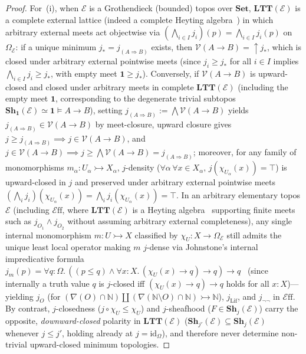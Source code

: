 \documentclass[10pt,twoside,openright]{book}
\theoremstyle{crmplain}
\theoremstyle{crmdef}
\theoremstyle{crmremark}
\newcommand{\Eff}{\mathcal{E}\mathrm{ff}}
\begin{document}
\begin{proof}
For~(i), when $\mathcal{E}$ is a Grothendieck (bounded) topos over $\mathbf{Set}$, $\mathbf{LTT}(\mathcal{E})$ is a complete external lattice (indeed a complete Heyting algebra~\cite[\S A4.5]{Johnstone02}) in which arbitrary external meets act objectwise via $(\bigwedge_{i \in I} j_i)(p) = \bigwedge_{i \in I} j_i(p)$ on $\Omega_{\mathcal{E}}$: if a unique minimum $j_* = j_{(A \Rightarrow B)}$ exists, then $\mathcal{V}(A \to B) = {\uparrow} j_*$, which is closed under arbitrary external pointwise meets (since $j_i \ge j_*$ for all $i \in I$ implies $\bigwedge_{i \in I} j_i \ge j_*$, with empty meet $\mathbf{1} \ge j_*$). Conversely, if $\mathcal{V}(A \to B)$ is upward-closed and closed under arbitrary meets in complete $\mathbf{LTT}(\mathcal{E})$ (including the empty meet $\mathbf{1}$, corresponding to the degenerate trivial subtopos $\mathbf{Sh}_{\mathbf{1}}(\mathcal{E}) \simeq \mathbf{1} \models A \to B$), setting $j_{(A \Rightarrow B)} := \bigwedge \mathcal{V}(A \to B)$ yields $j_{(A \Rightarrow B)} \in \mathcal{V}(A \to B)$ by meet-closure, upward closure gives $j \ge j_{(A \Rightarrow B)} \implies j \in \mathcal{V}(A \to B)$, and $j \in \mathcal{V}(A \to B) \implies j \ge \bigwedge \mathcal{V}(A \to B) = j_{(A \Rightarrow B)}$; moreover, for any family of monomorphisms $m_\alpha : U_\alpha \rightarrowtail X_\alpha$, $j$-density ($\forall \alpha\,\forall x \in X_\alpha,\, j(\chi_{U_\alpha}(x)) = \top$) is upward-closed in $j$ and preserved under arbitrary external pointwise meets $(\bigwedge_i j_i)(\chi_{U_\alpha}(x)) = \bigwedge_i j_i(\chi_{U_\alpha}(x)) = \top$. In an arbitrary elementary topos $\mathcal{E}$ (including $\Eff$, where $\mathbf{LTT}(\mathcal{E})$ is a Heyting algebra~\cite[\S A4.5]{Johnstone02} supporting finite meets such as $j_{O_1} \wedge j_{O_2}$ without assuming arbitrary external completeness), any single internal monomorphism $m : U \rightarrowtail X$ classified by $\chi_U : X \to \Omega_{\mathcal{E}}$ still admits the unique least local operator making $m$ $j$-dense via Johnstone's internal impredicative formula $j_m(p) = \forall q : \Omega.\, ((p \le q) \wedge \forall x : X.\, (\chi_U(x) \to q) \to q) \to q$~\cite[A4.5]{Johnstone02} (since internally a truth value $q$ is $j$-closed iff $(\chi_U(x) \to q) \to q$ holds for all $x : X$)---yielding $j_O$ (for $(\nabla(O)\cap\mathbb{N}) \amalg (\nabla(\mathbb{N}\setminus O)\cap\mathbb{N}) \rightarrowtail \mathbb{N}$), $j_{\mathrm{Lif}}$, and $j_{\neg\neg}$ in $\Eff$. By contrast, $j$-closedness ($j \circ \chi_U \le \chi_U$) and $j$-sheafhood ($F \in \mathbf{Sh}_j(\mathcal{E})$) carry the opposite, \emph{downward-closed} polarity in $\mathbf{LTT}(\mathcal{E})$ ($\mathbf{Sh}_{j'}(\mathcal{E}) \subseteq \mathbf{Sh}_j(\mathcal{E})$ whenever $j \le j'$, holding already at $j = \mathrm{id}_\Omega$), and therefore never determine non-trivial upward-closed minimum topologies.


\end{proof}
\end{document}
